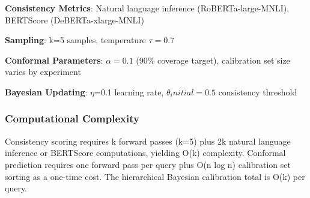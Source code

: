 \textbf{Consistency Metrics}: Natural language inference (RoBERTa-large-MNLI), BERTScore (DeBERTa-xlarge-MNLI)

\textbf{Sampling}: k=5 samples, temperature $\tau =0.7$

\textbf{Conformal Parameters}: $\alpha =0.1$ (90\% coverage target), calibration set size varies by experiment

\textbf{Bayesian Updating}: $\eta$=0.1 learning rate, $\theta _initial=0.5$ consistency threshold

\subsubsection{Computational Complexity}

Consistency scoring requires k forward passes (k=5) plus 2k natural language inference or BERTScore computations, yielding O(k) complexity. Conformal prediction requires one forward pass per query plus O(n log n) calibration set sorting as a one-time cost. The hierarchical Bayesian calibration total is O(k) per query.
